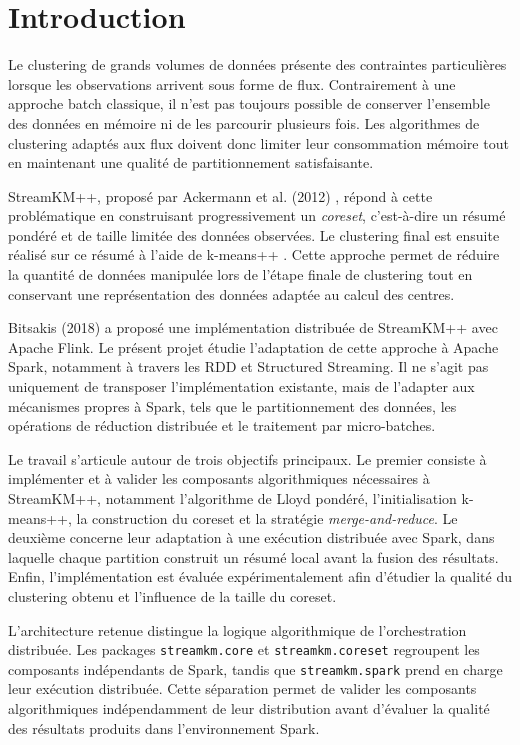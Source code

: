 
\chapter{Introduction}
\label{ch:introduction}

Le clustering de grands volumes de données présente des contraintes particulières lorsque les observations arrivent sous forme de flux. Contrairement à une approche batch classique, il n'est pas toujours possible de conserver l'ensemble des données en mémoire ni de les parcourir plusieurs fois. Les algorithmes de clustering adaptés aux flux doivent donc limiter leur consommation mémoire tout en maintenant une qualité de partitionnement satisfaisante.

StreamKM++, proposé par Ackermann et al. (2012) \cite{ackermann2012}, répond à cette problématique en construisant progressivement un \emph{coreset}, c'est-à-dire un résumé pondéré et de taille limitée des données observées. Le clustering final est ensuite réalisé sur ce résumé à l'aide de k-means++ \cite{arthur2007}. Cette approche permet de réduire la quantité de données manipulée lors de l'étape finale de clustering tout en conservant une représentation des données adaptée au calcul des centres.

Bitsakis (2018) \cite{bitsakis2018} a proposé une implémentation distribuée de StreamKM++ avec Apache Flink. Le présent projet étudie l'adaptation de cette approche à Apache Spark, notamment à travers les RDD et Structured Streaming. Il ne s'agit pas uniquement de transposer l'implémentation existante, mais de l'adapter aux mécanismes propres à Spark, tels que le partitionnement des données, les opérations de réduction distribuée et le traitement par micro-batches.

Le travail s'articule autour de trois objectifs principaux. Le premier consiste à implémenter et à valider les composants algorithmiques nécessaires à StreamKM++, notamment l'algorithme de Lloyd pondéré, l'initialisation k-means++, la construction du coreset et la stratégie \emph{merge-and-reduce}. Le deuxième concerne leur adaptation à une exécution distribuée avec Spark, dans laquelle chaque partition construit un résumé local avant la fusion des résultats. Enfin, l'implémentation est évaluée expérimentalement afin d'étudier la qualité du clustering obtenu et l'influence de la taille du coreset.

L'architecture retenue distingue la logique algorithmique de l'orchestration distribuée. Les packages \texttt{streamkm.core} et \texttt{streamkm.coreset} regroupent les composants indépendants de Spark, tandis que \texttt{streamkm.spark} prend en charge leur exécution distribuée. Cette séparation permet de valider les composants algorithmiques indépendamment de leur distribution avant d'évaluer la qualité des résultats produits dans l'environnement Spark.
